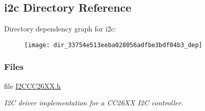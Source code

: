 \subsection{i2c Directory Reference}
\label{dir_33754e513eeba028056adfbe3bdf04b3}
Directory dependency graph for i2c\+:
\nopagebreak
\begin{figure}[H]
\begin{center}
\leavevmode
\texttt{[image: dir\_33754e513eeba028056adfbe3bdf04b3\_dep]}
\end{center}
\end{figure}
\subsubsection*{Files}
\begin{DoxyCompactItemize}
\item 
file \hyperlink{_i2_c_c_c26_x_x_8h}{I2\+C\+C\+C26\+X\+X.\+h}
\begin{DoxyCompactList}\small\item\em I2\+C driver implementation for a C\+C26\+X\+X I2\+C controller. \end{DoxyCompactList}\end{DoxyCompactItemize}
